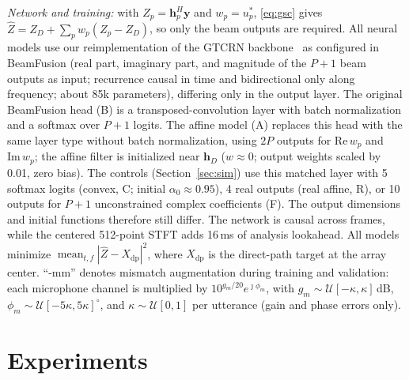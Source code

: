 \documentclass[journal]{IEEEtran}
\begin{document}
\emph{Network and training:} with $Z_p=\mathbf h_p^H\mathbf y$ and $w_p=u_p^*$, \eqref{eq:gsc} gives $\hat Z=Z_D+\sum_pw_p(Z_p-Z_D)$, so only the beam outputs are required. All neural models use our reimplementation of the GTCRN backbone~\cite{rong2024gtcrn} as configured in BeamFusion (real part, imaginary part, and magnitude of the $P+1$ beam outputs as input; recurrence causal in time and bidirectional only along frequency; about 85k parameters), differing only in the output layer. The original BeamFusion head (B) is a transposed-convolution layer with batch normalization and a softmax over $P+1$ logits. The affine model (A) replaces this head with the same layer type without batch normalization, using $2P$ outputs for $\mathrm{Re}\,w_p$ and $\mathrm{Im}\,w_p$; the affine filter is initialized near $\mathbf h_D$ ($w\approx0$; output weights scaled by 0.01, zero bias). The controls (Section~\ref{sec:sim}) use this matched layer with 5 softmax logits (convex, C; initial $\alpha_0\approx0.95$), 4 real outputs (real affine, R), or 10 outputs for $P+1$ unconstrained complex coefficients (F). The output dimensions and initial functions therefore still differ. The network is causal across frames, while the centered 512-point STFT adds 16\,ms of analysis lookahead. All models minimize $\operatorname{mean}_{t,f}|\hat Z-X_{\mathrm{dp}}|^2$, where $X_{\mathrm{dp}}$ is the direct-path target at the array center. ``-mm'' denotes mismatch augmentation during training and validation: each microphone channel is multiplied by $10^{g_m/20}e^{\jmath\phi_m}$, with $g_m\sim\mathcal U[-\kappa,\kappa]$\,dB, $\phi_m\sim\mathcal U[-5\kappa,5\kappa]^\circ$, and $\kappa\sim\mathcal U[0,1]$ per utterance (gain and phase errors only).

\section{Experiments}
\label{sec:experiments}
\end{document}
